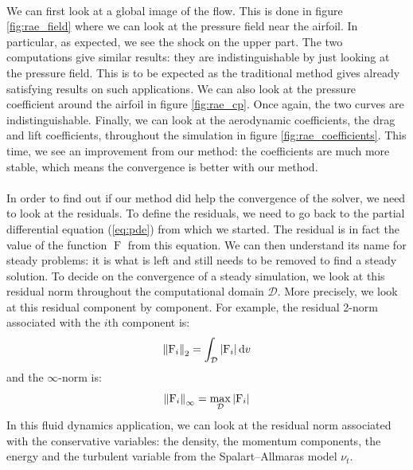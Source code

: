         \paragraph{}
        We can first look at a global image of the flow.
        This is done in figure \ref{fig:rae_field} where we can look at the pressure field near the airfoil.
        In particular, as expected, we see the shock on the upper part.
        The two computations give similar results: they are indistinguishable by just looking at the pressure field.
        This is to be expected as the traditional method gives already satisfying results on such applications.
        We can also look at the pressure coefficient around the airfoil in figure \ref{fig:rae_cp}.
        Once again, the two curves are indistinguishable.
        Finally, we can look at the aerodynamic coefficients, the drag and lift coefficients, throughout the simulation in figure \ref{fig:rae_coefficients}.
        This time, we see an improvement from our method: the coefficients are much more stable, which means the convergence is better with our method.

        \paragraph{}
        In order to find out if our method did help the convergence of the solver, we need to look at the residuals.
        To define the residuals, we need to go back to the partial differential equation (\ref{eq:pde}) from which we started.
        The residual is in fact the value of the function $\operatorname{F}$ from this equation.
        We can then understand its name for steady problems: it is what is left and still needs to be removed to find a steady solution.
        To decide on the convergence of a steady simulation, we look at this residual norm throughout the computational domain $\mathcal{D}$.
        More precisely, we look at this residual component by component.
        For example, the residual 2-norm associated with the $i$th component is:
        \begin{equation}
          \norm[2]{\operatorname{F}_i} = \int_\mathcal{D} \left| \operatorname{F}_i \right| \mathrm{d}v
        \end{equation}
        and the $\infty$-norm is:
        \begin{equation}
          \norm[\infty]{\operatorname{F}_i} = \max_\mathcal{D} \left| \operatorname{F}_i \right|
        \end{equation}
        In this fluid dynamics application, we can look at the residual norm associated with the conservative variables: the density, the momentum components, the energy and the turbulent variable from the Spalart--Allmaras model $\nu_t$.

